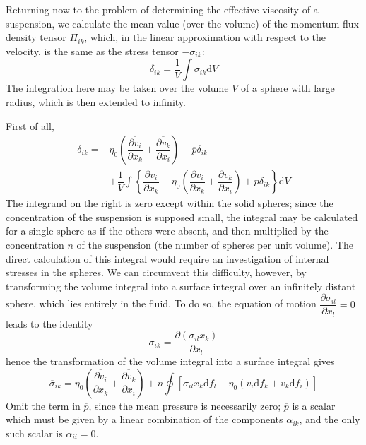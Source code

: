 \documentclass[conference]{IEEEtran}
\theoremstyle{definition}
\theoremstyle{remark}
\begin{document}
    Returning now to the problem of determining the effective viscosity of a suspension, we calculate the mean value (over the volume) of the momentum flux density tensor $\Pi_{ik}$, which, in the linear approximation with respect to the velocity, is the same as the stress tensor $-\sigma_{ik}$:
    \begin{equation*}
        \delta_{ik} = \dfrac1V \int \sigma_{ik} \mathrm{d} V
    \end{equation*}
    The integration here may be taken over the volume $V$ of a sphere with large radius, which is then extended to infinity.

    First of all,
    \begin{align}
        \delta_{ik} =& \eta_0 \left( \dfrac{\overline{\partial v_i}}{\partial x_k} + \dfrac{\overline{\partial v_k}}{\partial x_i} \right) - \overline{p} \delta_{ik} \nonumber \\
        &+ \dfrac1V \int \left\{ \dfrac{\partial v_i}{\partial x_k} - \eta_0 \left( \dfrac{\partial v_i}{\partial x_k} + \dfrac{\partial v_k}{\partial x_i} \right) + p \delta_{ik} \right\} \mathrm{d} V
        \label{eq:whole_sigma}
    \end{align}
    The integrand on the right is zero except within the solid spheres; since the concentration of the suspension is supposed small, the integral may be calculated for a single sphere as if the others were absent, and then multiplied by the concentration $n$ of the suspension (the number of spheres per unit volume). The direct calculation of this integral would require an investigation of internal stresses in the spheres. We can circumvent this difficulty, however, by transforming the volume integral into a surface integral over an infinitely distant sphere, which lies entirely in the fluid. To do so, the equation of motion $\dfrac{\partial \sigma_{il}}{\partial x_l} = 0$ leads to the identity
    \begin{equation*}
        \sigma_{ik} = \dfrac{\partial (\sigma_{il} x_k)}{\partial x_l}
    \end{equation*}
    hence the transformation of the volume integral into a surface integral gives
    \begin{equation*}
        \overline{\sigma}_{ik} = \eta_0 \left( \dfrac{\overline{\partial v_i}}{\partial x_k} + \dfrac{\overline{\partial v_k}}{\partial x_i} \right) + n \oint [\sigma_{il} x_k \mathrm{d} f_l - \eta_0 (v_i \mathrm{d} f_k + v_k \mathrm{d} f_i)]
    \end{equation*}
    Omit the term in $\overline{p}$, since the mean pressure is necessarily zero; $\overline{p}$ is a scalar which must be given by a linear combination of the components $\alpha_{ik}$, and the only such scalar is $\alpha_{ii} = 0$.
\end{document}
